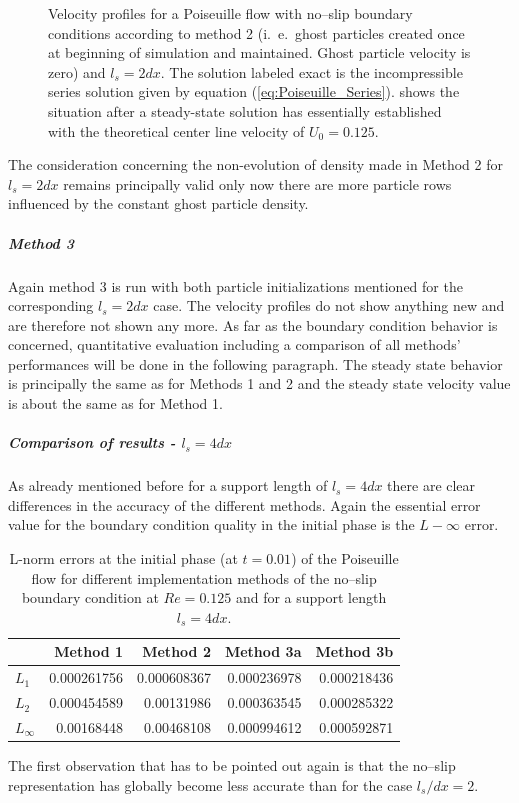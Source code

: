 \documentclass[11pt,a4paper,twoside]{report}
\begin{document}
\begin{figure}[!htbp]
\caption[Velocity profiles Poiseuille flow]{Velocity profiles for a Poiseuille flow with no--slip boundary conditions according to method 2 (i.\ e.\ ghost particles created once at beginning of simulation and maintained. Ghost particle velocity is zero) and $l_s=2dx$. The solution labeled exact is the incompressible series solution given by equation (\ref{eq:Poiseuille_Series}).   shows the situation after a steady-state solution has essentially established with the theoretical center line velocity of $U_0=0.125$.}

\end{figure}


The consideration concerning the non-evolution of density made in Method 2 for $l_s=2dx$ remains principally valid only now there are more particle rows influenced by the constant ghost particle density.

\subparagraph{Method 3}
Again method 3 is run with both particle initializations mentioned for the corresponding $l_s=2dx$ case. The velocity profiles do not show anything new and are therefore not shown any more. As far as the boundary condition behavior is concerned, quantitative evaluation including a comparison of all methods' performances will be done in the following paragraph. The steady state behavior is principally the same as for Methods 1 and 2 and the steady state velocity value is about the same as for Method 1.


\subparagraph{Comparison of results - $l_s=4dx$}

As already mentioned before for a support length of $l_s=4dx$ there are clear differences in the accuracy of the different methods. Again the essential error value for the boundary condition quality in the initial phase is the $L-\infty$ error.  
 
\begin{table}[h] %
\label{tab:2DSPH_LinearWall_Poiseuille_Errors_t0_01}
\centering
\begin{tabular}[c]{||l||r|r|r|r||} %
\hline
\hline
 &{\bf Method 1} & {\bf Method 2} & {\bf Method 3a}& {\bf Method 3b}\\
\hline
\hline
$L_1$&0.000261756 & 0.000608367 & 0.000236978& 0.000218436\\
\hline
$L_2$&0.000454589 & 0.00131986 & 0.000363545& 0.000285322 \\
\hline
$L_\infty$&0.00168448  & 0.00468108 & 0.000994612& 0.000592871\\
\hline
\hline
\end{tabular}

  \caption[]{L-norm errors at the initial phase (at $t=0.01$) of the Poiseuille flow 
for different implementation methods of the no--slip boundary condition at $Re=0.125$ and for a support length $l_s=4dx$.}
\end{table}
The first observation that has to be pointed out again is that the no--slip representation has globally become less accurate than for the case $l_s/dx=2$. 
\end{document}
